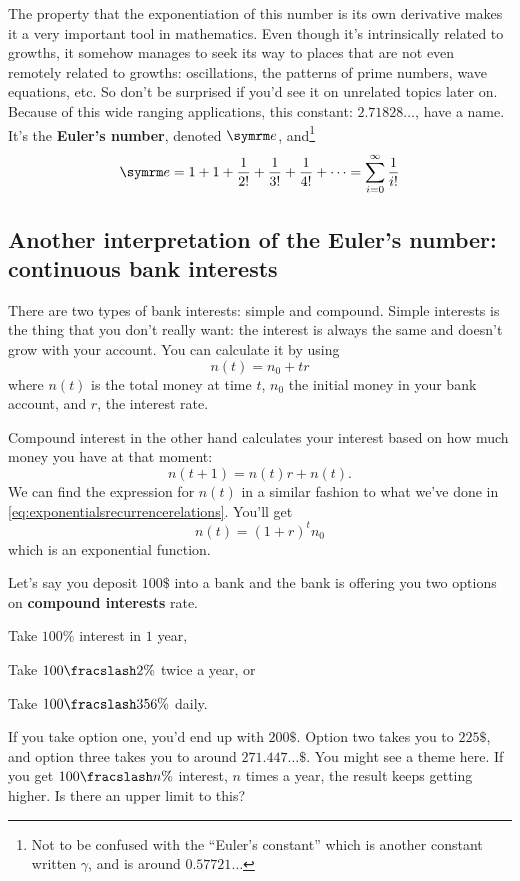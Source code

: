 The property that the exponentiation of this number is its own derivative makes it a very important tool in mathematics. Even though it's intrinsically related to growths, it somehow manages to seek its way to places that are not even remotely related to growths: oscillations, the patterns of prime numbers, wave equations, etc. So don't be surprised if you'd see it on unrelated topics later on. Because of this wide ranging applications, this constant: $2.71828\dots$, have a name. It's the \textbf{Euler's number}, denoted $\e$, and\footnote{Not to be confused with the ``Euler's constant'' which is another constant written $\gamma$, and is around $0.57721\dots$}
\begin{equation}
  \e = 1 + 1 + \frac{1}{2!} + \frac{1}{3!} + \frac{1}{4!} + \dots = \sum_{i = 0}^{\infty}\frac{1}{i!}
\end{equation}

\subsection{Another interpretation of the Euler's number: continuous bank interests}

There are two types of bank interests: simple and compound. Simple interests is the thing that you don't really want: the interest is always the same and doesn't grow with your account. You can calculate it by using
\begin{equation}
  n(t) = n_0 + tr
\end{equation}
where $n(t)$ is the total money at time $t$, $n_0$ the initial money in your bank account, and $r$, the interest rate.

Compound interest in the other hand calculates your interest based on how much money you have at that moment:
\begin{equation}
  n(t + 1) = n(t)r + n(t).
\end{equation}
We can find the expression for $n(t)$ in a similar fashion to what we've done in \cref{eq:exponentialsrecurrencerelations}. You'll get
\begin{equation}
  n(t) = (1 + r)^tn_0 \label{eq:compoundinterestformula}
\end{equation}
which is an exponential function.

Let's say you deposit $100\$$ into a bank and the bank is offering you two options on \textbf{compound interests} rate. \begin{enumerate*}[label = \arabic*)]\item Take $100\%$ interest in $1$ year, \item Take $\flatfrac{100}{2}\%$ twice a year, or \item Take $\flatfrac{100}{356}\%$ daily.\end{enumerate*} If you take option one, you'd end up with $200\$$. Option two takes you to $225\$$, and option three takes you to around $271.447\dots\$$. You might see a theme here. If you get $\flatfrac{100}{n}\%$ interest, $n$ times a year, the result keeps getting higher. Is there an upper limit to this?

